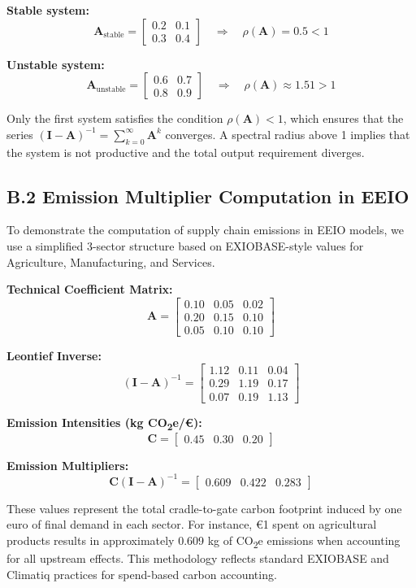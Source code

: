 \documentclass[12pt,a4paper]{article}
\begin{document}
\textbf{Stable system:}
\[
\mathbf{A}_{\text{stable}} =
\begin{bmatrix}
0.2 & 0.1 \\
0.3 & 0.4
\end{bmatrix}
\quad \Rightarrow \quad \rho(\mathbf{A}) = 0.5 < 1
\]

\textbf{Unstable system:}
\[
\mathbf{A}_{\text{unstable}} =
\begin{bmatrix}
0.6 & 0.7 \\
0.8 & 0.9
\end{bmatrix}
\quad \Rightarrow \quad \rho(\mathbf{A}) \approx 1.51 > 1
\]

Only the first system satisfies the condition \( \rho(\mathbf{A}) < 1 \), which ensures that the series \( (\mathbf{I} - \mathbf{A})^{-1} = \sum_{k=0}^\infty \mathbf{A}^k \) converges. A spectral radius above 1 implies that the system is not productive and the total output requirement diverges.

\subsection*{B.2 Emission Multiplier Computation in EEIO}

To demonstrate the computation of supply chain emissions in EEIO models, we use a simplified 3-sector structure based on EXIOBASE-style values for Agriculture, Manufacturing, and Services.

\textbf{Technical Coefficient Matrix:}
\[
\mathbf{A} =
\begin{bmatrix}
0.10 & 0.05 & 0.02 \\
0.20 & 0.15 & 0.10 \\
0.05 & 0.10 & 0.10
\end{bmatrix}
\]

\textbf{Leontief Inverse:}
\[
(\mathbf{I} - \mathbf{A})^{-1} =
\begin{bmatrix}
1.12 & 0.11 & 0.04 \\
0.29 & 1.19 & 0.17 \\
0.07 & 0.19 & 1.13
\end{bmatrix}
\]

\textbf{Emission Intensities (kg CO\textsubscript{2}e/€):}
\[
\mathbf{C} = \begin{bmatrix} 0.45 & 0.30 & 0.20 \end{bmatrix}
\]

\textbf{Emission Multipliers:}
\[
\mathbf{C} (\mathbf{I} - \mathbf{A})^{-1} =
\begin{bmatrix}
0.609 & 0.422 & 0.283
\end{bmatrix}
\]

These values represent the total cradle-to-gate carbon footprint induced by one euro of final demand in each sector. For instance, €1 spent on agricultural products results in approximately 0.609 kg of CO\textsubscript{2}e emissions when accounting for all upstream effects. This methodology reflects standard EXIOBASE and Climatiq practices for spend-based carbon accounting.
\end{document}
